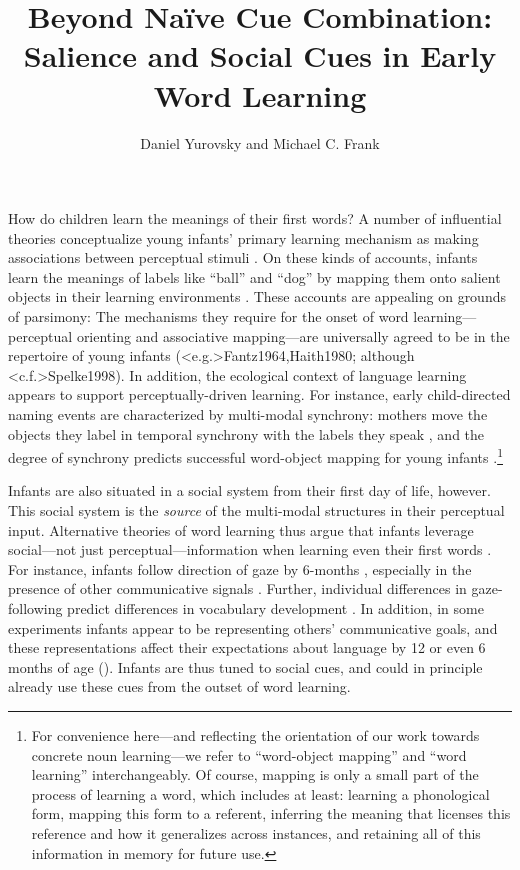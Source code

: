 \documentclass[man,floatsintext]{apa6}
\title{Beyond Na\"{i}ve Cue Combination: Salience and Social Cues in Early Word Learning}
\author{Daniel Yurovsky and Michael C. Frank}
\affiliation{Department of Psychology, Stanford University}
\begin{document}
\maketitle


How do children learn the meanings of their first words? A number of influential theories conceptualize young infants' primary learning mechanism as making associations between perceptual stimuli \cite{Piaget1952, Vygotsky1978}. On these kinds of accounts, infants learn the meanings of labels like ``ball'' and ``dog'' by mapping them onto salient objects in their learning environments \cite{Werker1998,Smith2000}. These accounts are appealing on grounds of parsimony: The mechanisms they require for the onset of word learning---perceptual orienting and associative mapping---are universally agreed to be in the repertoire of young infants (\citeNP<e.g.>{Fantz1964,Haith1980}; although \citeNP<c.f.>{Spelke1998}). In addition, the ecological context of language learning appears to support perceptually-driven learning. For instance, early child-directed naming events are characterized by multi-modal synchrony: mothers move the objects they label in temporal synchrony with the labels they speak \cite{Gogate2000}, and the degree of synchrony predicts successful word-object mapping for young infants \cite{Gogate2006}.\footnote{For convenience here---and reflecting the orientation of our work towards concrete noun learning---we refer to ``word-object mapping'' and ``word learning'' interchangeably. Of course, mapping is only a small part of the process of learning a word, which includes at least: learning a phonological form, mapping this form to a referent, inferring the meaning that licenses this reference and how it generalizes across instances, and retaining all of this information in memory for future use.}

Infants are also situated in a social system from their first day of life, however. This social system is the \emph{source} of the multi-modal structures in their perceptual input. Alternative theories of word learning thus argue that infants leverage social---not just perceptual---information when learning even their first words \cite{Bruner1983,Bloom1998}. For instance, infants follow direction of gaze by 6-months \cite{Dentremont1997}, especially in the presence of other communicative signals \cite{Senju2008}. Further, individual differences in gaze-following predict differences in vocabulary development \cite{Brooks2008}. In addition, in some experiments infants appear to be representing others' communicative goals, and these representations affect their expectations about language by 12 or even 6 months of age (). Infants are thus tuned to social cues, and could in principle already use these cues from the outset of word learning.
\end{document}
